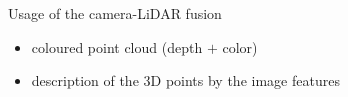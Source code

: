 \documentclass[pdf]{beamer}
\begin{document}
	\begin{frame}{Usage of the camera-LiDAR fusion}
			\begin{itemize}
				\item coloured point cloud (depth $+$ color)
				\item description of the $3$D points by the image features
			\end{itemize}
		
		\begin{minipage}{0.47\textwidth}
		\begin{figure}[h]
			\centering


\end{figure}
\end{minipage}
\end{frame}
\end{document}

